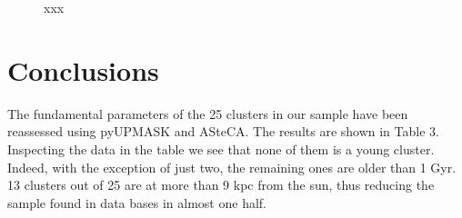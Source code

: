 \documentclass[draft]{aa}
\begin{document}
  \cite{Salaris_2004}

  \begin{figure}
   \caption{xxx}
   \label{fig:age_vs_feh}
  \end{figure}








\section{Conclusions}
 \label{sec:conclusions}

  The fundamental parameters of the 25 clusters in our sample have been reassessed
  using pyUPMASK and ASteCA. The results are shown in Table 3. Inspecting the data
  in the table we see that none of them is a young cluster. Indeed, with the
  exception of just two, the remaining ones are older than 1 Gyr. 13 clusters out
  of 25 are at more than 9 kpc from the sun, thus reducing the sample found in
  data bases in almost one half.
\end{document}
